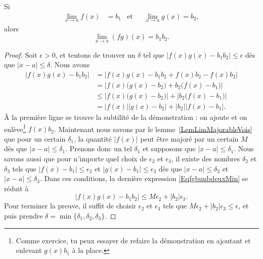 \begin{theorem}     \label{Tholimfgabab}
    Si
    \begin{align}
        \lim_{x\to a}f(x)&=b_1&\text{et}&&\lim_{x\to a}g(x)=b_2,
    \end{align}
    alors
    \begin{equation}
        \lim_{x\to a}(fg)(x)=b_1b_2.
    \end{equation}
\end{theorem}

\begin{proof}
    Soit $\epsilon>0$, et tentons de trouver un $\delta$ tel que $| f(x)g(x)-b_1b_2 |\leq \epsilon$ dès que $| x-a |\leq \delta$. Nous avons
    \begin{equation}    \label{EqfgbunbdeuxMin}
    \begin{split}
    | f(x)g(x)-b_1b_2 |&=|  f(x)g(x)-b_1b_2 +f(x)b_2-f(x)b_2 |\\
            &=\left|   f(x)\big( g(x)-b_2 \big)+b_2\big( f(x)-b_1 \big)    \right|\\
            &\leq \left|  f(x)\big( g(x)-b_2 \big)  \right|+\left|  b_2\big( f(x)-b_1 \big)    \right|\\
            &= | f(x) | | g(x)-b_2  |+| b_2 | |f(x)-b_1 |.
    \end{split}
    \end{equation}
    À la première ligne se trouve la subtilité de la démonstration : on ajoute et on enlève\footnote{Comme exercice, tu peux essayer de refaire la démonstration en ajoutant et enlevant $g(x)b_1$ à la place.} $f(x)b_2$. Maintenant nous savons par le lemme~\ref{LemLimMajorableVois} que pour un certain $\delta_1$, la quantité $| f(x) |$ peut être majoré par un certain $M$ dès que $| x-a |\leq \delta_1$. Prenons donc un tel $\delta_1$ et supposons que $| x-a |\leq \delta_1$. Nous savons aussi que pour n'importe quel choix de $\epsilon_2$ et $\epsilon_3$, il existe des nombres $\delta_2$ et $\delta_3$ tels que $| f(x)-b_1 |\leq \epsilon_2$ et $| g(x)-b_1 |\leq \epsilon_3$ dès que $| x-a |\leq\delta_2$ et $| x-a |\leq\delta_3$. Dans ces conditions, la dernière expression \eqref{EqfgbunbdeuxMin} se réduit à
    \begin{equation}
    | f(x)g(x)-b_1b_2 |\leq M\epsilon_2+| b_2 |\epsilon_3.
    \end{equation}
    Pour terminer la preuve, il suffit de choisir $\epsilon_2$ et $\epsilon_3$ tels que $M\epsilon_2+| b_2 |\epsilon_3\leq\epsilon$, et puis prendre $\delta=\min\{ \delta_1,\delta_2,\delta_3 \}$.


\end{proof}
